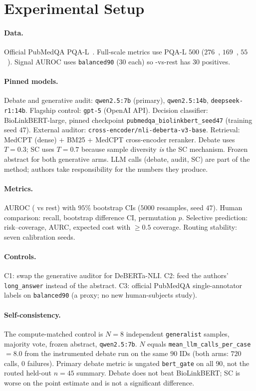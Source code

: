 \section{Experimental Setup}
\label{sec:experiments}

\paragraph{Data.}
Official PubMedQA PQA-L~\citep{jin2019pubmedqa}. Full-scale metrics use PQA-L
$500$ ($276$~\yes{}, $169$~\no{}, $55$~\maybe{}). Signal AUROC uses
\texttt{balanced90} ($30$ each) so \maybe{}-vs-rest has $30$ positives.

\paragraph{Pinned models.}
Debate and generative audit: \texttt{qwen2.5:7b} (primary),
\texttt{qwen2.5:14b}, \texttt{deepseek-r1:14b}. Flagship control:
\texttt{gpt-5} (OpenAI API). Decision classifier: BioLinkBERT-large, pinned
checkpoint \texttt{pubmedqa\_biolinkbert\_seed47} (training seed $47$). External auditor:
\texttt{cross-encoder/nli-deberta-v3-base}. Retrieval: MedCPT (dense) $+$ BM25
$+$ MedCPT cross-encoder reranker. Debate uses $T{=}0.3$; SC uses $T{=}0.7$
because sample diversity \emph{is} the SC mechanism. Frozen abstract for
both generative arms. LLM calls (debate, audit, SC) are part of the
method; authors take responsibility for the numbers they produce.

\paragraph{Metrics.}
AUROC (\maybe{} vs rest) with $95\%$ bootstrap CIs ($5000$ resamples, seed
$47$). Human comparison: \maybe{} recall, bootstrap difference CI, permutation
$p$. Selective prediction: risk--coverage, AURC, expected cost with
$\ge 0.5$ coverage. Routing stability: seven calibration seeds.

\paragraph{Controls.}
C1: swap the generative auditor for DeBERTa-NLI. C2: feed the authors'
\texttt{long\_answer} instead of the abstract. C3: official PubMedQA
single-annotator labels on \texttt{balanced90} (a proxy; no new
human-subjects study).

\paragraph{Self-consistency.}
The compute-matched control is $N{=}8$ independent \texttt{generalist}
samples, majority vote, frozen abstract, \texttt{qwen2.5:7b}. $N$ equals
\texttt{mean\_llm\_calls\_per\_case}${}=8.0$ from the instrumented debate
run on the same $90$ IDs (both arms: $720$ calls, $0$ failures). Primary
debate metric is ungated \texttt{bert\_gate} on all $90$, not the routed
held-out $n{=}45$ summary. Debate does not beat BioLinkBERT; SC is worse
on the point estimate and is not a significant difference.
